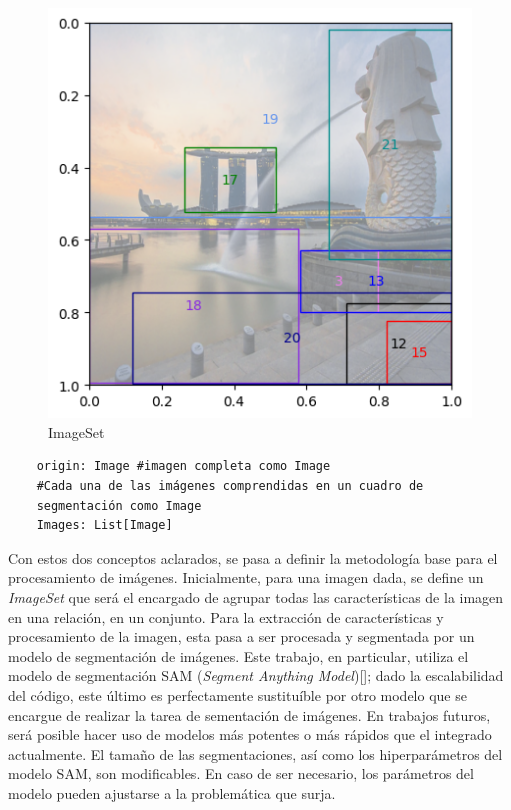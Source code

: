 \begin{figure}[H]
    \centering
    \includegraphics[height=0.3\textheight]{Graphics/ImageSetExample.png}
    \caption{ImageSet}
    \label{fig:imageset_example}
\end{figure}
\begin{verbatim}
    origin: Image #imagen completa como Image    
    #Cada una de las imágenes comprendidas en un cuadro de 
    segmentación como Image
    Images: List[Image]     
\end{verbatim}


Con estos dos conceptos aclarados, se pasa a definir la metodología base para el procesamiento de imágenes. Inicialmente, para una imagen dada, se define un \textit{ImageSet} que será el encargado de agrupar todas las características de la imagen en una relación, en un conjunto. Para la extracción de características y procesamiento de la imagen, esta pasa a ser procesada y segmentada por un modelo de segmentaci\'on de im\'agenes. Este trabajo, en particular, utiliza el modelo de segmentación SAM (\textit{Segment Anything Model})[\cite{huggingface2022sam}]; dado la escalabilidad del código, este \'ultimo es perfectamente sustituíble por otro modelo que se encargue de realizar la tarea de sementaci\'on de imágenes. En trabajos futuros, ser\'a posible hacer uso de modelos más potentes o más rápidos que el integrado actualmente. El tamaño de las segmentaciones, así como los hiperparámetros del modelo SAM, son modificables. En caso de ser necesario, los par\'ametros del modelo pueden ajustarse a la problem\'atica que surja.

